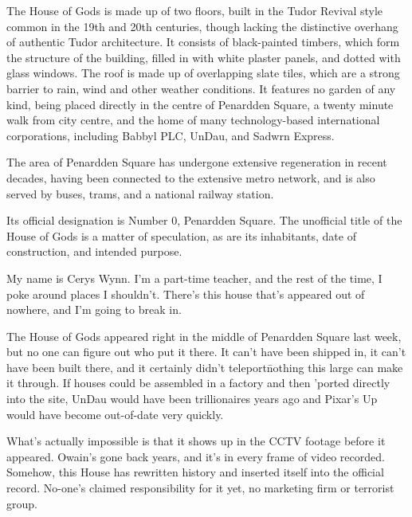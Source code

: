 

\prelude

The House of Gods is made up of two floors, built in the Tudor Revival
style common in the 19th and 20th centuries, though lacking the
distinctive overhang of authentic Tudor architecture. It consists of
black-painted timbers, which form the structure of the building,
filled in with white plaster panels, and dotted with glass
windows. The roof is made up of overlapping slate tiles, which are a
strong barrier to rain, wind and other weather conditions. It features
no garden of any kind, being placed directly in the centre of
Penardden Square, a twenty minute walk from city centre, and the home of
many technology-based international corporations, including Babbyl
PLC, UnDau, and Sadwrn Express.

The area of Penardden Square has undergone extensive regeneration in
recent decades, having been connected to the extensive metro network,
and is also served by buses, trams, and a national railway station.

Its official designation is Number 0, Penardden Square. The unofficial
title of the House of Gods is a matter of speculation, as are its
inhabitants, date of construction, and intended purpose.

\fugue


My name is Cerys Wynn. I'm a part-time teacher, and the rest of the
time, I poke around places I shouldn't. There's this house that's
appeared out of nowhere, and I'm going to break in.

The House of Gods appeared right in the middle of Penardden Square
last week, but no one can figure out who put it there. It can't have
been shipped in, it can't have been built there, and it certainly
didn't teleport\=nothing this large can make it through. If houses
could be assembled in a factory and then 'ported directly into the
site, UnDau would have been trillionaires years ago and Pixar's Up
would have become out-of-date very quickly.

What's actually impossible is that it shows up in the CCTV footage
before it appeared. Owain's gone back years, and it's in every frame
of video recorded. Somehow, this House has rewritten history and
inserted itself into the official record. No-one's claimed
responsibility for it yet, no marketing firm or terrorist group.

